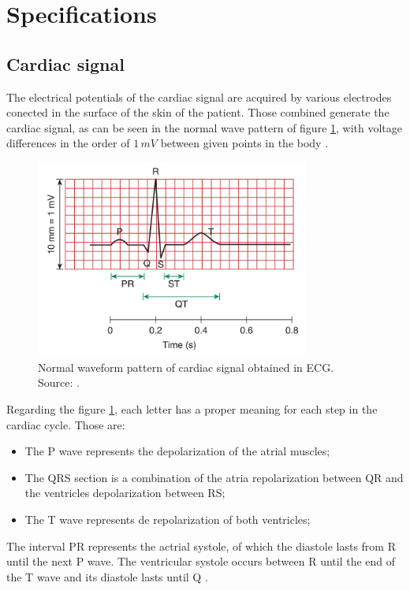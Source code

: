 \section{Specifications}

\subsection{Cardiac signal}

The electrical potentials of the cardiac signal are acquired by various electrodes conected in the surface of the skin of the patient. Those combined generate the cardiac signal, as can be seen in the normal wave pattern of figure \ref{fig:cardiac_signal}, with voltage differences in the order of $1 \, mV$ between given points in the body \cite{khandpur2019compendium}.

\begin{figure}[h!] 
    \centering
    \includegraphics[width=9cm]{images/cardiac_signal.JPG}
    \caption{Normal waveform pattern of cardiac signal obtained in ECG. Source: \cite{khandpur2019compendium}.}
    \label{fig:cardiac_signal} 
\end{figure}

Regarding the figure \ref{fig:cardiac_signal}, each letter has a proper meaning for each step in the cardiac cycle. Those are:

\begin{itemize}
    \item The P wave represents the depolarization of the atrial muscles;
    \item The QRS section is a combination of the atria repolarization between QR and the ventricles depolarization between RS;
    \item The T wave represents de repolarization of both ventricles;
\end{itemize}

The interval PR represents the actrial systole, of which the diastole lasts from R until the next P wave. The ventricular systole occurs between R until the end of the T wave and its diastole lasts until Q \cite{openstax}. 

